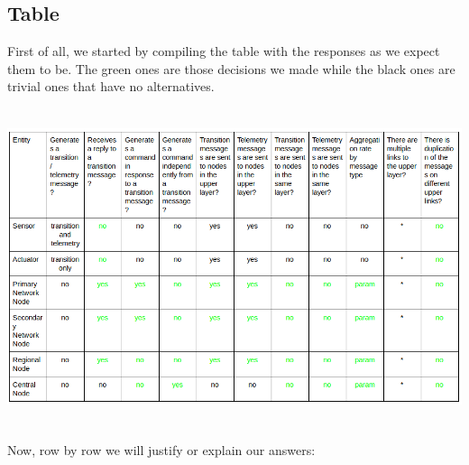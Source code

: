 \documentclass[11pt]{article}
\begin{document}
\subsection{Table}
First of all, we started by compiling the table with the responses as we expect them to be. The green ones are those decisions we made while the black ones are trivial ones that have no alternatives.\\
\includegraphics[width=15cm, height=10cm]{table.png}
Now, row by row we will justify or explain our answers:
\end{document}
